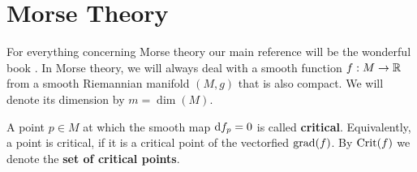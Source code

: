 \section{Morse Theory}

For everything concerning Morse theory our main reference will be the wonderful book \cite{banyaga2004lectures}. 
In Morse theory, we will always deal with a smooth function $f:M\to \mathbb{R}$ from a smooth Riemannian manifold $(M,g)$ that is also compact. We will denote its dimension by $m=\dim (M)$.
\begin{definition}
	A point $p\in M$ at which the smooth map  
$\mathop{}\!\mathrm{d} f _p=0$  is called \textbf{critical}. Equivalently, a point is critical, if it is a critical point of the vectorfied $\mathrm{grad}(f)$. By $\mathrm{Crit} (f)$ we denote the \textbf{set of critical points}.
\end{definition}

